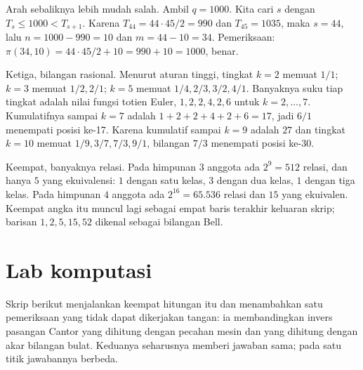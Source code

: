 Arah sebaliknya lebih mudah salah. Ambil $q = 1000$. Kita cari $s$ dengan
$T_s \le 1000 < T_{s+1}$. Karena $T_{44} = 44 \cdot 45/2 = 990$ dan $T_{45} = 1035$,
maka $s = 44$, lalu $n = 1000 - 990 = 10$ dan $m = 44 - 10 = 34$. Pemeriksaan:
$\pi(34,10) = 44 \cdot 45/2 + 10 = 990 + 10 = 1000$, benar.

Ketiga, bilangan rasional. Menurut aturan tinggi, tingkat $k = 2$ memuat $1/1$;
$k = 3$ memuat $1/2, 2/1$; $k = 5$ memuat $1/4, 2/3, 3/2, 4/1$. Banyaknya suku tiap
tingkat adalah nilai fungsi totien Euler, $1, 2, 2, 4, 2, 6$ untuk $k = 2, \dots, 7$.
Kumulatifnya sampai $k = 7$ adalah $1+2+2+4+2+6 = 17$, jadi $6/1$ menempati posisi
ke-17. Karena kumulatif sampai $k = 9$ adalah $27$ dan tingkat $k = 10$ memuat
$1/9, 3/7, 7/3, 9/1$, bilangan $7/3$ menempati posisi ke-30.

Keempat, banyaknya relasi. Pada himpunan $3$ anggota ada $2^{9} = 512$ relasi, dan
hanya $5$ yang ekuivalensi: $1$ dengan satu kelas, $3$ dengan dua kelas, $1$ dengan tiga
kelas. Pada himpunan $4$ anggota ada $2^{16} = 65.536$ relasi dan $15$ yang ekuivalen.
Keempat angka itu muncul lagi sebagai empat baris terakhir keluaran skrip; barisan
$1, 2, 5, 15, 52$ dikenal sebagai bilangan Bell.


\section{Lab komputasi}

Skrip berikut menjalankan keempat hitungan itu dan menambahkan satu pemeriksaan yang
tidak dapat dikerjakan tangan: ia membandingkan invers pasangan Cantor yang dihitung
dengan pecahan mesin dan yang dihitung dengan akar bilangan bulat. Keduanya
seharusnya memberi jawaban sama; pada satu titik jawabannya berbeda.

